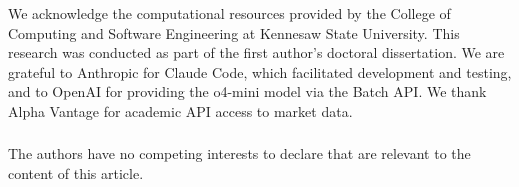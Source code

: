 \documentclass[runningheads,a4paper]{llncs}
\begin{document}







\begin{credits}
\subsubsection{\ackname}
We acknowledge the computational resources provided by the College of Computing and Software Engineering at Kennesaw State University. This research was conducted as part of the first author's doctoral dissertation. We are grateful to Anthropic for Claude Code, which facilitated development and testing, and to OpenAI for providing the o4-mini model via the Batch API. We thank Alpha Vantage for academic API access to market data.

\subsubsection{\discintname}
The authors have no competing interests to declare that are relevant to the content of this article.
\end{credits}



\end{document}
